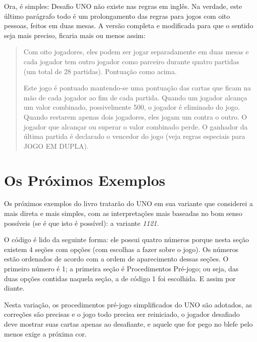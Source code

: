 Ora, é simples: Desafio UNO não existe nas regras em inglês. Na verdade, este último parágrafo todo é um prolongamento das regras para jogos com oito pessoas, feitos em duas mesas. A versão completa e modificada para que o sentido seja mais preciso, ficaria mais ou menos assim:

\begin{quotation}
Com oito jogadores, eles podem ser jogar separadamente em duas mesas e cada jogador tem outro jogador como parceiro durante quatro partidas (um total de 28 partidas). Pontuação como acima.

Este jogo é pontuado mantendo-se uma pontuação das cartas que ficam na mão de cada jogador ao fim de cada partida. Quando um jogador alcança um valor combinado, possivelmente 500, o jogador é eliminado do jogo. Quando restarem apenas dois jogadores, eles jogam um contra o outro. O jogador que alcançar ou superar o valor combinado perde. O ganhador da última partida é declarado o vencedor do jogo (veja regras especiais para JOGO EM DUPLA).
\end{quotation}

\section{Os Próximos Exemplos}

Os próximos exemplos do livro tratarão do UNO em sua variante que considerei a mais direta e mais simples, com as interpretações mais baseadas no bom senso possíveis (se é que isto é possível): a variante \emph{1121}.

O código é lido da seguinte forma: ele possui quatro números porque nesta seção existem 4 seções com opções (com escolhas a fazer sobre o jogo). Os números estão ordenados de acordo com a ordem de aparecimento dessas seções. O primeiro número é 1; a primeira seção é Procedimentos Pré-jogo; ou seja, das duas opções contidas naquela seção, a de código 1 foi escolhida. E assim por diante.

Nesta variação, os procedimentos pré-jogo simplificados do UNO são adotados, as correções são precisas e o jogo todo precisa ser reiniciado, o jogador desafiado deve mostrar suas cartas apenas ao desafiante, e aquele que for pego no blefe pelo menos exige a próxima cor.
